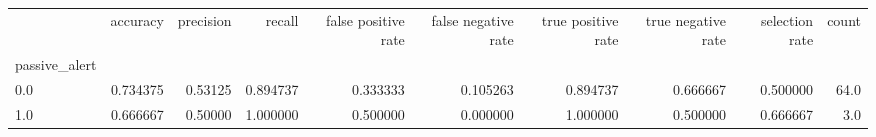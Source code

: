 \begin{tabular}{lrrrrrrrrr}
\toprule
{} &  accuracy &  precision &    recall &  false positive rate &  false negative rate &  true positive rate &  true negative rate &  selection rate &  count \\
passive\_alert &           &            &           &                      &                      &                     &                     &                 &        \\
\midrule
0.0           &  0.734375 &    0.53125 &  0.894737 &             0.333333 &             0.105263 &            0.894737 &            0.666667 &        0.500000 &   64.0 \\
1.0           &  0.666667 &    0.50000 &  1.000000 &             0.500000 &             0.000000 &            1.000000 &            0.500000 &        0.666667 &    3.0 \\
\bottomrule
\end{tabular}
